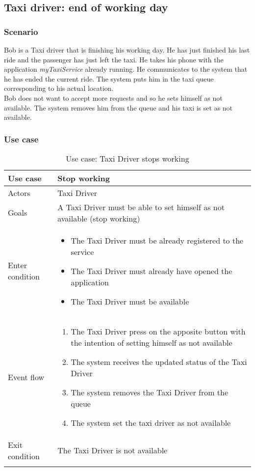 \pagebreak
\subsection{Taxi driver: end of working day}
\subsubsection{Scenario}
Bob is a Taxi driver that is finishing his working day. He has just finished his last ride and the passenger has just left the taxi. He takes his phone with the application \textit{myTaxiService} already running. He communicates to the system that he has ended the current ride. The system puts him in the taxi queue corresponding to his actual location.\\
Bob does not want to accept more requests and so he sets himself as not available. The system removes him from the queue and his taxi is set as not available.

\subsubsection{Use case}
\begin{center}
\begin{longtable}{| p{} | p{} |} \hline
	Use case & \textbf{Stop working} \\ \hline 
	Actors & Taxi Driver \\ \hline
	Goals & A Taxi Driver must be able to set himself as not available (stop working)  \\ \hline
	Enter condition & \begin{itemize}
						\item The Taxi Driver must be already registered to the service
						\item The Taxi Driver must already have opened the application
						\item The Taxi Driver must be available
						\end{itemize} \\ \hline
	Event flow & \begin{enumerate}
					\item The Taxi Driver press on the apposite button with the intention of setting himself as not available
					\item The system receives the updated status of the Taxi Driver
					\item The system removes the Taxi Driver from the queue
					\item The system set the taxi driver as not available
				\end{enumerate} \\ \hline
	Exit condition & The Taxi Driver is not available\\ \hline
	\caption{Use case: Taxi Driver stops working}
\end{longtable}
\end{center}
